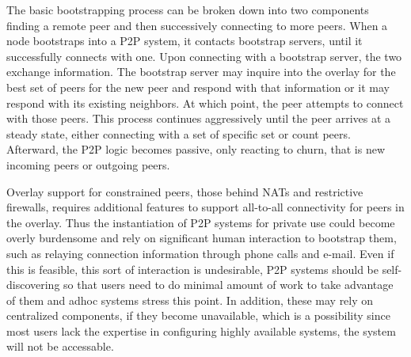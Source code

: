 \documentclass[conference]{IEEEtran}
\begin{document}
The basic bootstrapping process can be broken down into two components finding
a remote peer and then successively connecting to more peers.  When a node
bootstraps into a P2P system, it contacts bootstrap servers, until it
successfully connects with one.  Upon connecting with a bootstrap server, the
two exchange information.  The bootstrap server may inquire into the overlay
for the best set of peers for the new peer and respond with that information or
it may respond with its existing neighbors.  At which point, the peer attempts
to connect with those peers.  This process continues aggressively until the
peer arrives at a steady state, either connecting with a set of specific set or
count peers.  Afterward, the P2P logic becomes passive, only reacting to churn,
that is new incoming peers or outgoing peers.

Overlay support for constrained peers, those behind NATs and restrictive
firewalls, requires additional features to support all-to-all connectivity for
peers in the overlay.  Thus the instantiation of P2P systems for private use
could become overly burdensome and rely on significant human interaction to
bootstrap them, such as relaying connection information through phone calls and
e-mail.  Even if this is feasible, this sort of interaction is undesirable, P2P
systems should be self-discovering so that users need to do minimal amount of
work to take advantage of them and adhoc systems stress this point.  In
addition, these may rely on centralized components, if they become unavailable,
which is a possibility since most users lack the expertise in configuring
highly available systems, the system will not be accessable.
\end{document}
